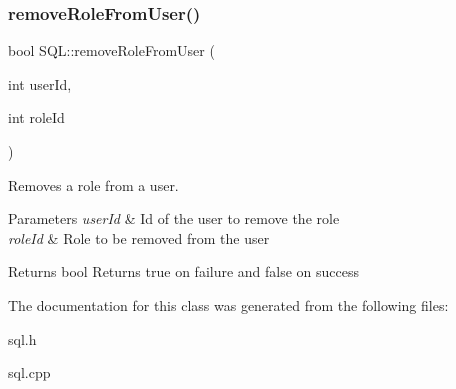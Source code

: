 \subsubsection{\texorpdfstring{remove\+Role\+From\+User()}{removeRoleFromUser()}}
{\footnotesize\ttfamily bool S\+Q\+L\+::remove\+Role\+From\+User (\begin{DoxyParamCaption}\item[{int}]{user\+Id,  }\item[{int}]{role\+Id }\end{DoxyParamCaption})}



Removes a role from a user. 


\begin{DoxyParams}{Parameters}
{\em user\+Id} & Id of the user to remove the role \\
\hline
{\em role\+Id} & Role to be removed from the user \\
\hline
\end{DoxyParams}
\begin{DoxyReturn}{Returns}
{\ttfamily bool} Returns true on failure and false on success 
\end{DoxyReturn}


The documentation for this class was generated from the following files\+:\begin{DoxyCompactItemize}
\item 
sql.\+h\item 
sql.\+cpp\end{DoxyCompactItemize}
